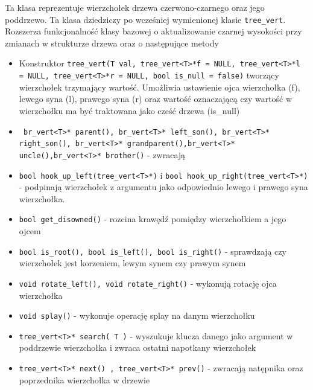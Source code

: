 \documentclass[declaration,shortabstract]{iithesis}
\theoremstyle{thm}
\theoremstyle{remark}
\theoremstyle{plain}
\theoremstyle{plain}
\theoremstyle{plain}
\begin{document}
Ta klasa reprezentuje wierzchołek drzewa czerwono-czarnego oraz jego poddrzewo. Ta klasa dziedziczy po wcześniej wymienionej klasie \texttt{tree\_vert}. Rozszerza funkcjonalność klasy bazowej o aktualizowanie czarnej wysokości przy zmianach w strukturze drzewa oraz o następujące metody

\begin{itemize}

\item{Konstruktor \texttt{tree\_vert(T val, tree\_vert<T>*f = NULL, tree\_vert<T>*l = NULL, tree\_vert<T>*r = NULL, bool is\_null = false)} tworzący wierzchołek trzymający wartość. Umożliwia ustawienie ojca wierzchołka (f), lewego syna (l), prawego syna (r) oraz wartość oznaczającą czy wartość w wierzchołku ma być traktowana jako cześć drzewa (is\_null)}

\item{\texttt{ br\_vert<T>* parent(), br\_vert<T>* left\_son(), br\_vert<T>* right\_son(), br\_vert<T>* grandparent(),br\_vert<T>* uncle(),br\_vert<T>* brother()} - zwracają }
    
\item{\texttt{bool hook\_up\_left(tree\_vert<T>*)} i \texttt{bool hook\_up\_right(tree\_vert<T>*)} - podpinają wierzchołek z argumentu jako odpowiednio lewego i prawego syna wierzchołka.}

\item{\texttt{bool get\_disowned()} - rozcina krawędź pomiędzy wierzchołkiem a jego ojcem}

\item{\texttt{bool is\_root(), bool is\_left(),  bool is\_right()} - sprawdzają czy wierzchołek jest korzeniem, lewym synem czy prawym synem}

\item{\texttt{void rotate\_left(), void rotate\_right()} - wykonują rotację ojca wierzchołka}
    
\item{\texttt{void splay()} - wykonuje operację splay na danym wierzchołku}
    
\item{\texttt{tree\_vert<T>* search( T )} - wyszukuje klucza danego jako argument w poddrzewie wierzchołka i zwraca ostatni napotkany wierzchołek}
   
\item{\texttt{tree\_vert<T>* next() ,  tree\_vert<T>* prev()} - zwracają natępnika oraz poprzednika wierzchołka w drzewie}
\end{itemize}
\end{document}
